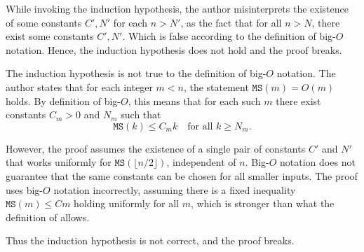 \documentclass[12pt]{article}
\begin{document}
\begin{solution}
    \bbni

    While invoking the induction hypothesis, the author misinterprets the existence of some constants $C', N'$ for each $n > N'$, as the fact that for all $n > N$, there exist some constants $C', N'$. Which is false according to the definition of big-$O$ notation. Hence, the induction hypothesis does not hold and the proof breaks. 


    The induction hypothesis is not true to the definition of big-$O$ notation. The author states that for each integer $m < n$, the statement
    $\texttt{MS}(m) = O(m)$ holds. By definition of big-$O$, this means that for each
    such $m$ there exist constants $C_m > 0$ and $N_m$ such that
    \[
    \texttt{MS}(k) \le C_m k \quad \text{for all } k \ge N_m.
    \]

    However, the proof assumes the existence of a single pair of constants $C'$ and $N'$ that works uniformly for $\texttt{MS}(\lfloor n/2 \rfloor)$, independent of $n$. Big-$O$ notation does not guarantee that the same constants can be chosen for all smaller inputs. The proof uses big-$O$ notation incorrectly, assuming there is a fixed inequality $\texttt{MS}(m) \le C m$ holding uniformly for all $m$, which is stronger than what the definition of allows.

    Thus the induction hypothesis is not correct, and the proof breaks.

\end{solution}

\newpage 
\end{document}
